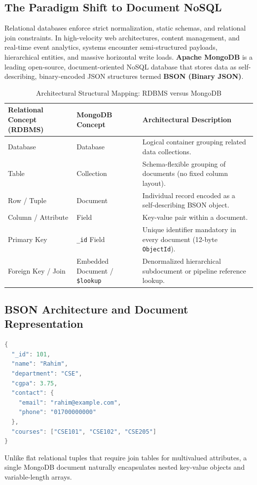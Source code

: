 \subsection{The Paradigm Shift to Document NoSQL}
Relational databases enforce strict normalization, static schemas, and relational join constraints. In high-velocity web architectures, content management, and real-time event analytics, systems encounter semi-structured payloads, hierarchical entities, and massive horizontal write loads. \textbf{Apache MongoDB} is a leading open-source, document-oriented NoSQL database that stores data as self-describing, binary-encoded JSON structures termed \textbf{BSON (Binary JSON)}.

\begin{table}[htbp]
\centering
\small
\caption{Architectural Structural Mapping: RDBMS versus MongoDB}
\label{tab:rdbms_vs_mongodb_mapping}
\begin{tabularx}{\textwidth}{l l X}
\toprule
\textbf{Relational Concept (RDBMS)} & \textbf{MongoDB Concept} & \textbf{Architectural Description} \\
\midrule
Database & Database & Logical container grouping related data collections. \\
Table & Collection & Schema-flexible grouping of documents (no fixed column layout). \\
Row / Tuple & Document & Individual record encoded as a self-describing BSON object. \\
Column / Attribute & Field & Key-value pair within a document. \\
Primary Key & \texttt{\_id} Field & Unique identifier mandatory in every document (12-byte \texttt{ObjectId}). \\
Foreign Key / Join & Embedded Document / \texttt{\$lookup} & Denormalized hierarchical subdocument or pipeline reference lookup. \\
\bottomrule
\end{tabularx}
\end{table}

\subsection{BSON Architecture and Document Representation}
\begin{lstlisting}[language=Java]
{
  "_id": 101,
  "name": "Rahim",
  "department": "CSE",
  "cgpa": 3.75,
  "contact": {
    "email": "rahim@example.com",
    "phone": "01700000000"
  },
  "courses": ["CSE101", "CSE102", "CSE205"]
}
\end{lstlisting}
Unlike flat relational tuples that require join tables for multivalued attributes, a single MongoDB document naturally encapsulates nested key-value objects and variable-length arrays.

